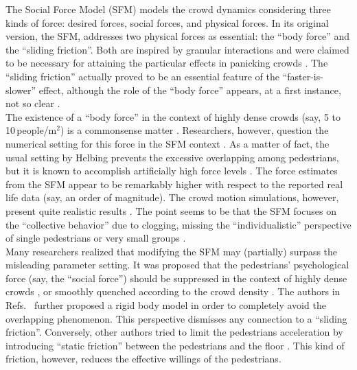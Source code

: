 \documentclass[preprint,12pt]{elsarticle}
\begin{document}
The Social Force Model (SFM) models the crowd dynamics 
considering three kinds of force: desired forces, social forces, and physical forces.
In its original version, the SFM, addresses two physical forces as essential: 
 the ``body force'' and the ``sliding friction''. Both are 
inspired by granular interactions and were claimed to be necessary  
for attaining the particular effects in panicking crowds \cite{helbing_2000}. 
The ``sliding friction'' actually proved to be an essential feature of the 
``faster-is-slower'' effect, although the role of the ``body force'' appears, 
at a first instance, not so clear \cite{dorso_2005,dorso_2007,dorso_2011}. \\ 

The existence of a ``body force'' in the context of highly dense crowds (say, 5 
to 10$\,$people/m$^2$) is a commonsense matter \cite{henein_2007,fruin_1993}. 
Researchers, however, question the numerical setting for this force in 
the SFM context \cite{lakoba_2005}. As a matter of fact, the usual setting by 
Helbing prevents the excessive overlapping among pedestrians, but it is known to 
accomplish artificially high force levels 
\cite{helbing_2000,lakoba_2005,langston_2006,lin_2017}. The force estimates 
from the SFM appear to be remarkably higher with respect to the reported real 
life data (say, an order of magnitude). The crowd motion simulations, however, 
present quite realistic results \cite{lakoba_2005,langston_2006,dorso_2017}. 
The 
point seems to be that the SFM focuses on the ``collective behavior'' due 
to clogging, missing the ``individualistic'' perspective  of single pedestrians 
or very small groups \cite{helbing_2000,henein_2007,narain_2009}.  \\ 

Many researchers realized that modifying the SFM may (partially) surpass the 
misleading parameter setting. It was proposed that the pedestrians' 
psychological force (say, the ``social force'') should be suppressed in the 
context of highly dense crowds 
\cite{pelechano_2007,moussaid_2011,alonso_2014,bottinelli_2017}, or smoothly 
quenched according to the crowd density \cite{song_2019}. The authors in 
Refs.~\cite{kabalan_2017,jebrane_2019} further proposed a rigid body model in 
order to completely avoid the overlapping phenomenon. This perspective 
dismisses 
any connection to a ``sliding friction''. Conversely, other authors tried to 
limit the pedestrians acceleration by introducing ``static friction'' between 
the pedestrians and the floor \cite{wang_2019}. This kind of friction, however, 
reduces the effective willings of the pedestrians.  \\  
\end{document}
